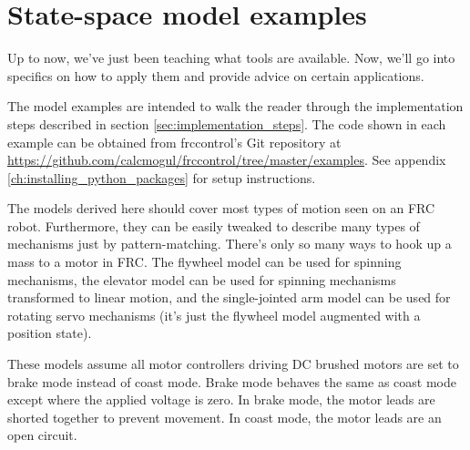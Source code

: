 
\chapter{State-space model examples}

Up to now, we've just been teaching what tools are available. Now, we'll go into
specifics on how to apply them and provide advice on certain applications.

The \gls{model} examples are intended to walk the reader through the
implementation steps described in section \ref{sec:implementation_steps}. The
code shown in each example can be obtained from frccontrol's Git repository at
\url{https://github.com/calcmogul/frccontrol/tree/master/examples}. See appendix
\ref{ch:installing_python_packages} for setup instructions.

The \glspl{model} derived here should cover most types of motion seen on an FRC
robot. Furthermore, they can be easily tweaked to describe many types of
mechanisms just by pattern-matching. There's only so many ways to hook up a mass
to a motor in FRC. The flywheel \gls{model} can be used for spinning mechanisms,
the elevator \gls{model} can be used for spinning mechanisms transformed to
linear motion, and the single-jointed arm \gls{model} can be used for rotating
servo mechanisms (it's just the flywheel \gls{model} augmented with a position
\gls{state}).

These \glspl{model} assume all motor controllers driving DC brushed motors are
set to brake mode instead of coast mode. Brake mode behaves the same as coast
mode except where the applied voltage is zero. In brake mode, the motor leads
are shorted together to prevent movement. In coast mode, the motor leads are an
open circuit.

\renewcommand*{\chapterpath}{\partpath/ss-model-examples}







